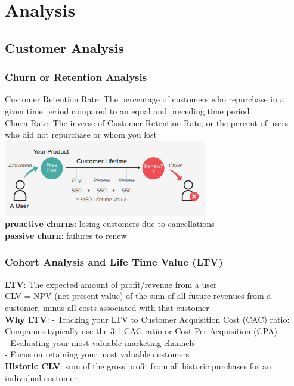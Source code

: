 \documentclass{beamer}
\begin{document}








\section{Analysis}
\subsection{Customer Analysis}

\begin{frame}\frametitle{Churn or Retention Analysis}
Customer Retention Rate: The percentage of customers who repurchase in a given time period compared to an equal and preceding time period\\
Churn Rate: The inverse of Customer Retention Rate, or the percent of users who did not repurchase or whom you lost\\

\includegraphics[scale=0.5]{churn}\\
\textbf{proactive churns}: losing customers due to cancellations\\ \textbf{passive churn}: failures to renew\\
\end{frame}


\begin{frame}\frametitle{Cohort Analysis and Life Time Value (LTV)}
	\textbf{LTV}: The expected amount of profit/revenue from a user\\
	CLV = NPV (net present value) of the sum of all future revenues from a customer, minus all costs associated with that customer\\
	\textbf{Why LTV}:
	- Tracking your LTV to Customer Acquisition Cost (CAC) ratio: Companies typically use the 3:1 CAC ratio or Cost Per Acquisition (CPA)\\
	- Evaluating your most valuable marketing channels\\
	- Focus on retaining your most valuable customers\\
	\textbf{Historic CLV}: sum of the gross profit from all historic purchases for an individual customer

	
\end{frame}
\end{document}
